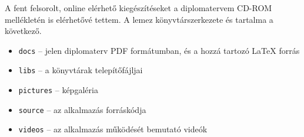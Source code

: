 A fent felsorolt, online elérhető kiegészítéseket a diplomatervem CD-ROM mellékletén is elérhetővé tettem. A lemez könyvtárszerkezete és tartalma a következő.

\begin{itemize}
  \item \texttt{docs} -- jelen diplomaterv PDF formátumban, és a hozzá tartozó \LaTeX{} forrás
  \item \texttt{libs} -- a könyvtárak telepítőfájljai
  \item \texttt{pictures} -- képgaléria
  \item \texttt{source} -- az alkalmazás forráskódja
  \item \texttt{videos} -- az alkalmazás működését bemutató videók
\end{itemize}